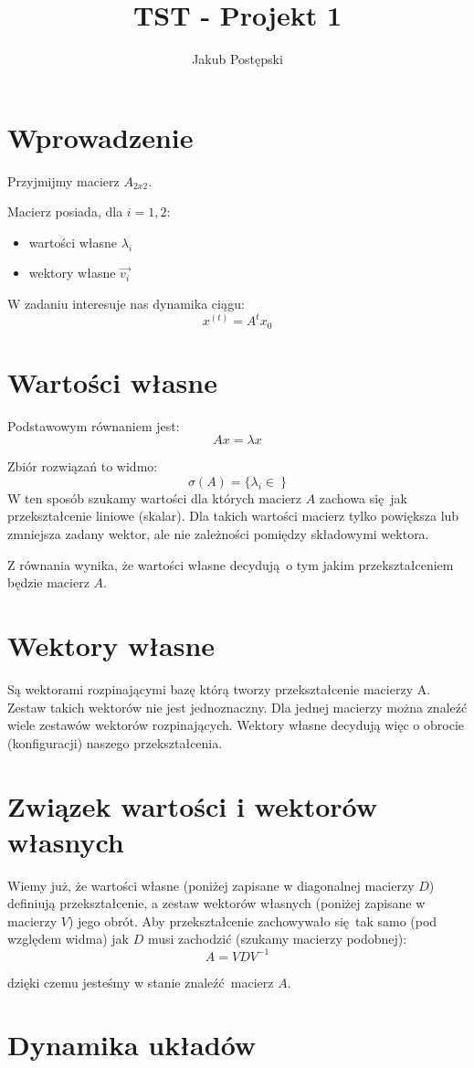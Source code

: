 \documentclass[]{article}
\title{TST - Projekt 1}
\author{Jakub Postępski}
\begin{document}
\maketitle


\section{Wprowadzenie}
Przyjmijmy macierz $A_{2x2}$.

Macierz posiada, dla $i = {1, 2}$:
\begin{itemize}
	\item wartości własne $\lambda_i$
	\item wektory własne $\vec{v_i}$ 
\end{itemize}

W zadaniu interesuje nas dynamika ciągu:
\[x^{(t)} = A^tx_0 \]

\section{Wartości własne}

Podstawowym równaniem jest:
\[ Ax = \lambda x\]

Zbiór rozwiązań to widmo: \[\sigma(A) = \{ \lambda_i \in \  \} \]
W ten sposób szukamy wartości dla których macierz $A$ zachowa się jak przekształcenie liniowe (skalar). Dla takich wartości macierz tylko powiększa lub zmniejsza zadany wektor, ale nie zależności pomiędzy składowymi wektora. 

Z równania wynika, że wartości własne decydują o tym jakim przekształceniem będzie macierz $A$.

\section{Wektory własne}
Są wektorami rozpinającymi bazę którą tworzy przekształcenie macierzy A. Zestaw takich wektorów nie jest jednoznaczny. Dla jednej macierzy można znaleźć wiele zestawów wektorów rozpinających. Wektory własne decydują więc o obrocie (konfiguracji) naszego przekształcenia. 

\section{Związek wartości i wektorów własnych}
Wiemy już, że wartości własne (poniżej zapisane w diagonalnej macierzy $D$) definiują przekształcenie, a zestaw wektorów własnych (poniżej zapisane w macierzy $V$) jego obrót. Aby przekształcenie zachowywało się tak samo (pod względem widma) jak $D$ musi zachodzić (szukamy macierzy podobnej):
\[A = VDV^{-1}\]

dzięki czemu jesteśmy w stanie znaleźć macierz $A$.

\section{Dynamika układów}
\end{document}

